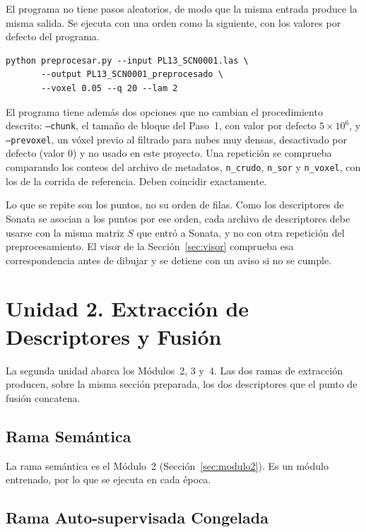 El programa no tiene pasos aleatorios, de modo que la misma entrada produce la
misma salida. Se ejecuta con una orden como la siguiente, con los valores por
defecto del programa.
\begin{lstlisting}[style=comando]
python preprocesar.py --input PL13_SCN0001.las \
       --output PL13_SCN0001_preprocesado \
       --voxel 0.05 --q 20 --lam 2
\end{lstlisting}
El programa tiene además dos opciones que no cambian el procedimiento descrito:
\texttt{--chunk}, el tamaño de bloque del Paso~1, con valor por defecto
$5\times10^{6}$, y \texttt{--prevoxel}, un vóxel previo al filtrado para nubes
muy densas, desactivado por defecto (valor 0) y no usado en este proyecto.
Una repetición se comprueba comparando los conteos del archivo de metadatos,
\texttt{n\_crudo}, \texttt{n\_sor} y \texttt{n\_voxel}, con los de la corrida de
referencia. Deben coincidir exactamente.

Lo que se repite son los puntos, no su orden de filas. Como los descriptores de
Sonata se asocian a los puntos por ese orden, cada archivo de descriptores debe
usarse con la misma matriz $S$ que entró a Sonata, y no con otra repetición del
preprocesamiento. El visor de la Sección~\ref{sec:visor} comprueba esa
correspondencia antes de dibujar y se detiene con un aviso si no se cumple.



\FloatBarrier
\section{Unidad 2. Extracción de Descriptores y Fusión}
\label{sec:unidad2}

La segunda unidad abarca los Módulos~2, 3 y~4. Las dos ramas de extracción
producen, sobre la misma sección preparada, los dos descriptores que el punto de
fusión concatena.

\FloatBarrier
\subsection{Rama Semántica}
\label{sec:rama-sem}

La rama semántica es el Módulo~2 (Sección~\ref{sec:modulo2}). Es un módulo
entrenado, por lo que se ejecuta en cada época.

\FloatBarrier
\subsection{Rama Auto-supervisada Congelada}
\label{sec:rama-ssl}

